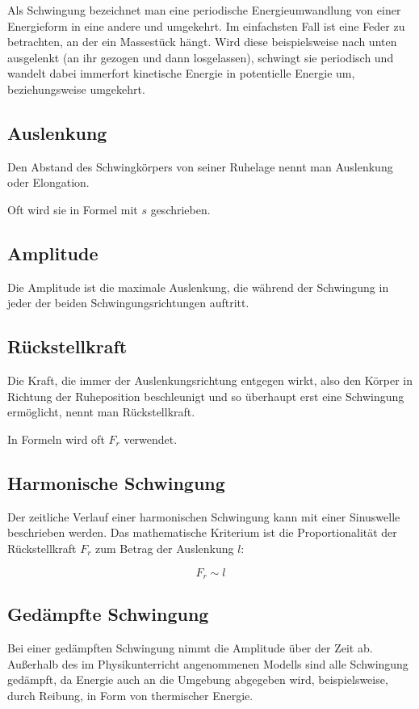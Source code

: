 Als Schwingung bezeichnet man eine periodische Energieumwandlung von einer Energieform in eine andere und umgekehrt. Im einfachsten Fall ist eine Feder zu betrachten, an der ein Massestück hängt. Wird diese beispielsweise nach unten ausgelenkt (an ihr gezogen und dann losgelassen), schwingt sie periodisch und wandelt dabei immerfort kinetische Energie in potentielle Energie um, beziehungsweise umgekehrt.


\subsection{Auslenkung}

Den Abstand des Schwingkörpers von seiner Ruhelage nennt man Auslenkung oder Elongation.

Oft wird sie in Formel mit $s$ geschrieben.


\subsection{Amplitude}

Die Amplitude ist die maximale Auslenkung, die während der Schwingung in jeder der beiden Schwingungsrichtungen auftritt.

\subsection{Rückstellkraft}

Die Kraft, die immer der Auslenkungsrichtung entgegen wirkt, also den Körper in Richtung der Ruheposition beschleunigt und so überhaupt erst eine Schwingung ermöglicht, nennt man Rückstellkraft.

In Formeln wird oft $F_r$ verwendet.


\subsection{Harmonische Schwingung} \label{subsec:harmonisch}

Der zeitliche Verlauf einer harmonischen Schwingung kann mit einer Sinuswelle beschrieben werden. Das mathematische Kriterium ist die Proportionalität der Rückstellkraft $F_{r}$ zum Betrag der Auslenkung $l$:

\begin{equation} \label{eq:kriterium_harmonisch}
	F_{r} \sim l
\end{equation}


\subsection{Gedämpfte Schwingung}

Bei einer gedämpften Schwingung nimmt die Amplitude über der Zeit ab. Außerhalb des im Physikunterricht angenommenen Modells sind alle Schwingung gedämpft, da Energie auch an die Umgebung abgegeben wird, beispielsweise, durch Reibung, in Form von thermischer Energie.

